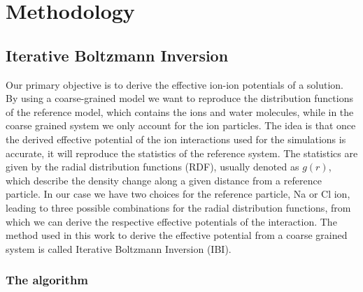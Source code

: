 \documentclass[10pt]{article}
\begin{document}
%


\section{Methodology}
\label{methodology}
    
    \subsection{Iterative Boltzmann Inversion}
        \label{ibi}   

        
        Our primary objective is to derive the effective ion-ion potentials of a solution. By using a coarse-grained model we want to reproduce the distribution functions of the reference model, which contains the ions and water molecules, while in the coarse grained system we only account for the ion particles. The idea is that once the derived effective potential of the ion interactions used for the simulations is accurate, it will reproduce the statistics of the reference system\cite{Ruhle}. The statistics are given by the radial distribution functions (RDF), usually denoted as $g(r)$, which describe the density change along a given distance from a reference particle. In our case we have two choices for the reference particle, Na or Cl ion, leading to three possible combinations for the radial distribution functions, from which we can derive the respective effective potentials of the interaction. The method used in this work to derive the effective potential from a coarse grained system is called Iterative Boltzmann Inversion (IBI). 
        
        \subsubsection{The algorithm}
\end{document}
